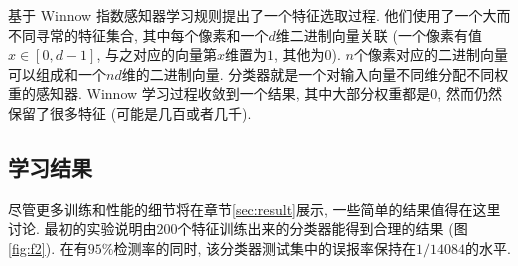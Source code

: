 \documentclass[a4paper,utf8,11pt]{ctexart}
\begin{document}
\citet{yang2000snow}基于 Winnow 指数感知器学习规则提出了一个特征选取过程. 他们使用了一个大而不同寻常的特征集合, 其中每个像素和一个$d$维二进制向量关联 (一个像素有值$x\in[0, d-1]$, 与之对应的向量第$x$维置为$1$, 其他为$0$). $n$个像素对应的二进制向量可以组成和一个$nd$维的二进制向量. 分类器就是一个对输入向量不同维分配不同权重的感知器. Winnow 学习过程收敛到一个结果, 其中大部分权重都是$0$, 然而仍然保留了很多特征 (可能是几百或者几千).

\subsection{学习结果}
尽管更多训练和性能的细节将在章节\ref{sec:result}展示, 一些简单的结果值得在这里讨论. 最初的实验说明由$200$个特征训练出来的分类器能得到合理的结果 (图\ref{fig:f2}). 在有$95\%$检测率的同时, 该分类器测试集中的误报率保持在$1/14084$的水平.
\end{document}
